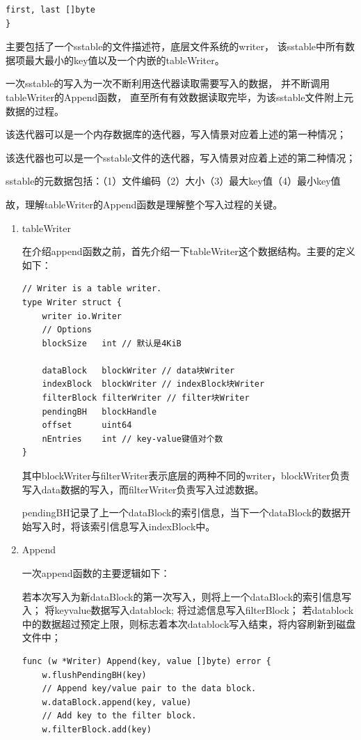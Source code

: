 \begin{enumerate}
\begin{enumerate}
\begin{lstlisting}[caption=tWriter , label=code_radds_storage_tWriter]
	first, last []byte
}
\end{lstlisting}

主要包括了一个sstable的文件描述符，底层文件系统的writer，
该sstable中所有数据项最大最小的key值以及一个内嵌的tableWriter。

一次sstable的写入为一次不断利用迭代器读取需要写入的数据，
并不断调用tableWriter的Append函数，
直至所有有效数据读取完毕，为该sstable文件附上元数据的过程。

该迭代器可以是一个内存数据库的迭代器，写入情景对应着上述的第一种情况；

该迭代器也可以是一个sstable文件的迭代器，写入情景对应着上述的第二种情况；

sstable的元数据包括：（1）文件编码（2）大小（3）最大key值（4）最小key值

故，理解tableWriter的Append函数是理解整个写入过程的关键。


			\begin{enumerate}
				\item tableWriter
				
				在介绍append函数之前，首先介绍一下tableWriter这个数据结构。主要的定义如下：
\begin{lstlisting}[caption=Writer , label=code_radds_storage_Writer]
// Writer is a table writer.
type Writer struct {
	writer io.Writer
	// Options
	blockSize   int // 默认是4KiB

	dataBlock   blockWriter // data块Writer
	indexBlock  blockWriter // indexBlock块Writer
	filterBlock filterWriter // filter块Writer
	pendingBH   blockHandle
	offset      uint64
	nEntries    int // key-value键值对个数
}				
\end{lstlisting}

其中blockWriter与filterWriter表示底层的两种不同的writer，blockWriter负责写入data数据的写入，而filterWriter负责写入过滤数据。

pendingBH记录了上一个dataBlock的索引信息，当下一个dataBlock的数据开始写入时，将该索引信息写入indexBlock中。
				\item Append 
				
				一次append函数的主要逻辑如下：

若本次写入为新dataBlock的第一次写入，则将上一个dataBlock的索引信息写入；
将keyvalue数据写入datablock;
将过滤信息写入filterBlock；
若datablock中的数据超过预定上限，则标志着本次datablock写入结束，将内容刷新到磁盘文件中；

\begin{lstlisting}[caption=Append , label=code_radds_storage_Append]
func (w *Writer) Append(key, value []byte) error {
	w.flushPendingBH(key)
	// Append key/value pair to the data block.
	w.dataBlock.append(key, value)
	// Add key to the filter block.
	w.filterBlock.add(key)
	

\end{lstlisting}
\end{enumerate}
\end{enumerate}
\end{enumerate}
